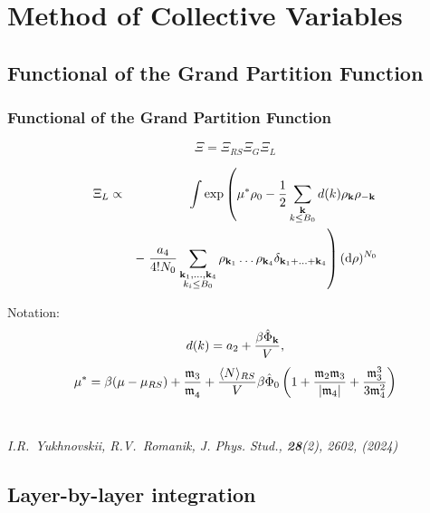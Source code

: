 \documentclass[8pt]{beamer}
\begin{document}
	\section{Method of Collective Variables}
	\subsection{Functional of the Grand Partition Function}
	
	\begin{frame}
		\frametitle{Functional of the Grand Partition Function}
		
		\begin{equation*}
			\label{Xi_as_prod}
			\Xi = \Xi_{RS}\Xi_G\Xi_L
		\end{equation*}
		
		\begin{eqnarray*}
			\label{Xi_L_1}
			\Xi_L & \propto &
			\int \exp\left(
			\mu^* \rho_0 - \frac{1}{2} \sum_{\substack{\vb k \\ k \leq B_0}} d(k) \rho_{\vb k} \rho_{-\vb k} 
			\right.\\
			&& -\left. \frac{a_4}{4! N_0} \sum_{\substack{\vb k_1, \dotsc, \vb k_4 \\ k_i \leq B_0}} \rho_{\vb k_1} \dotsc \rho_{\vb k_4} \delta_{\vb{k}_1 + \dotsc + \vb{k}_4} \right) ({\rm d} \rho)^{N_0}
			\nonumber
		\end{eqnarray*}
		
		Notation:
		\begin{equation*}
			d(k) = a_2 + \frac{\beta\hat{\Phi}_{\vb k}}{V},
		\end{equation*}
		\begin{equation*}
			\mu^* = \beta(\mu - \mu_{RS}) + \frac{\mathfrak{m}_3}{\mathfrak{m_4}} + 
			\frac{\langle N \rangle_{RS}}{V}\beta\hat{\Phi}_0 
			\left(
			1 + \frac{\mathfrak{m}_2 \mathfrak{m}_3}{\abs{\mathfrak{m}_4}} + \frac{\mathfrak{m}_3^3}{3\mathfrak{m}_4^2}
			\right)
		\end{equation*}
		\hfill
		\\
		\hfill
		
		\textit{I.R.~Yukhnovskii, R.V.~Romanik, J. Phys. Stud., {\bf 28}(2), 2602, (2024)}
		
	\end{frame}
	
	\subsection{Layer-by-layer integration}
	
\end{document}
